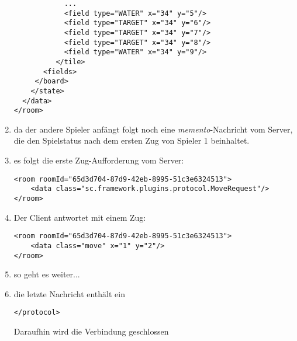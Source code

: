 \documentclass[12pt,a4paper, ngerman, oneside]{scrartcl}
\begin{document}
\begin{enumerate}
\begin{verbatim}
            ...
            <field type="WATER" x="34" y="5"/>
            <field type="TARGET" x="34" y="6"/>
            <field type="TARGET" x="34" y="7"/>
            <field type="TARGET" x="34" y="8"/>
            <field type="WATER" x="34" y="9"/>
          </tile>
       <fields>
     </board>
    </state>
  </data>
</room>
\end{verbatim}
\item da der andere Spieler anfängt folgt noch eine \textit{memento}-Nachricht vom Server, die den Spielstatus nach dem ersten Zug von Spieler 1 beinhaltet.
\item es folgt die erste Zug-Aufforderung vom Server: \begin{verbatim}
<room roomId="65d3d704-87d9-42eb-8995-51c3e6324513">
    <data class="sc.framework.plugins.protocol.MoveRequest"/>
</room>
\end{verbatim}
\item Der Client antwortet mit einem Zug: \begin{verbatim}
<room roomId="65d3d704-87d9-42eb-8995-51c3e6324513">
    <data class="move" x="1" y="2"/>
</room>
\end{verbatim}
\item so geht es weiter...
\item die letzte Nachricht enthält ein \begin{verbatim}
</protocol>
\end{verbatim}
Daraufhin wird die Verbindung geschlossen
\end{enumerate}
\end{document}
